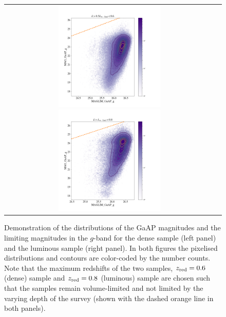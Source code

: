 \documentclass[fleqn,usenatbib,useAMS]{mnras}
\begin{document}
\begin{figure}
 
 \begin{tabular}{cc}
\includegraphics[width=0.5\textwidth]{figures_tmp/magg_lim_type_dense_zmax_0_6.png}
\includegraphics[width=0.5\textwidth]{figures_tmp/magg_lim_type_lum_zmax_0_8.png}
\end{tabular}
\caption{\label{fig:maglim_g} Demonstration of the distributions of the GaAP magnitudes and the limiting magnitudes in the $g$-band for the dense sample (left panel) and the luminous sample (right panel). In both figures the pixelised distributions and contours are color-coded by the number counts. Note that the maximum redshifts of the two samples, $z_{\rm red}=0.6$ (dense) sample and $z_{\rm red}=0.8$ (luminous) sample are chosen such that the samples remain volume-limited and not limited by the varying depth of the survey (shown with the dashed orange line in both panels).} 
\end{figure}
\end{document}
